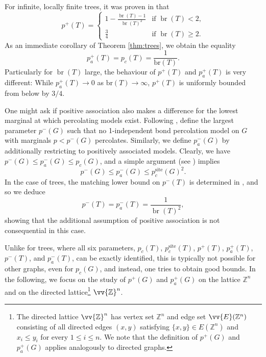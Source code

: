 \documentclass[11pt]{article}
\newcommand{\Z}{\mathbb{Z}}
\DeclareMathOperator{\br}{br}
\theoremstyle{remark}
\begin{document}
For infinite, locally finite trees, it was proven in \cite[Thm.\ 1.2--1.3]{Balister2012} that 
\begin{equation*}
	p^+(T) = \begin{cases}
		1- \frac{\br(T)-1}{\br(T)^2} & \text{if } \br(T)< 2, \\
		\frac{3}{4} & \text{if } \br(T) \ge 2. 
	\end{cases}
\end{equation*}
As an immediate corollary of Theorem \ref{thm:trees}, we obtain the equality 
	\begin{equation*}
		p_a^+(T) = p_c(T) =  \frac{1}{\textrm{br}(T)}.
	\end{equation*}
Particularly for $\br(T)$ large, the behaviour of $p^+(T)$ and $p^+_a(T)$ is very different: While $p_a^+(T) \to 0$ as $\textrm{br}(T) \to \infty$, $p^+(T)$ is uniformly bounded from below by $ 3/4$.

One might ask if positive association also makes a difference for the lowest marginal at which percolating models exist. Following \cite{Balister2012}, define the largest parameter $p^-(G)$ such that no 1-independent bond percolation model on $G$ with marginals $p < p^-(G)$ percolates. Similarly, we define $p_a^-(G)$ by additionally restricting to positively associated models. Clearly, we have $p^-(G) \le  p_a^-(G) \le p_c(G)$, and a simple argument  (see \cite[Prop.~4.1]{Balister2012}) implies
\begin{equation}
    p^-(G) \le p_a^-(G) \le p_c^{\mathrm{site}}(G)^2.
\end{equation}
In the case of trees, the matching lower bound on  $p^-(T)$ is determined in \cite[Thm.\ 4.2]{Balister2012}, and so we deduce
\begin{equation*}
	p^-(T) = p_a^-(T) = \frac{1}{\br(T)^2},
\end{equation*}
showing that the additional assumption of positive association is not consequential in this case. 

Unlike for trees, where all six parameters, $p_c(T)$, $p^{\mathrm{site}}_c(T)$, $p^+(T)$, $p_a^+(T)$, $p^-(T)$, and $p_a^-(T)$, can be exactly identified, this is typically not possible for other graphs, even for $p_c(G)$, and instead, one tries to obtain good bounds. In the following, we focus on the study of $p^{+}(G)$ and  $p_a^+(G)$ on the lattice $\Z^n$ and on the directed lattice\footnote{The directed lattice $\vv{\Z}^n$ has vertex set $\Z^n$ and edge set $\vv{E}(\Z^n)$ consisting of all directed edges $(x,y)$ satisfying $\{x,y\} \in E(\Z^n)$ and $x_i \le y_i$ for every $1\le i\le n$. We note that the definition of $p^{+}(G)$ and $p_a^{+}(G)$ applies analogously to directed graphs.} $\vv{\Z}^n$. 
\end{document}

